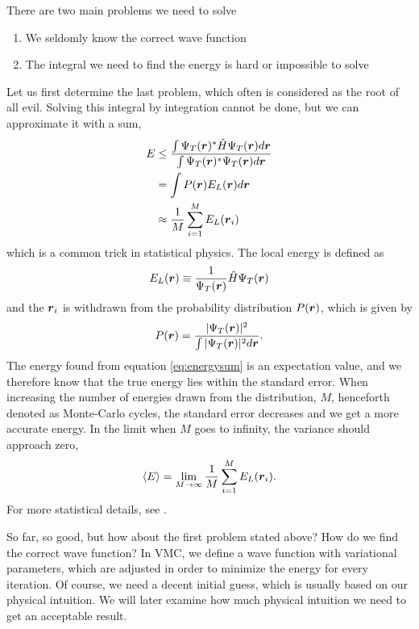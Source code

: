 There are two main problems we need to solve
\begin{enumerate}
	\item We seldomly know the correct wave function
	\item The integral we need to find the energy is hard or impossible to solve
\end{enumerate}
Let us first determine the last problem, which often is considered as the root of all evil. Solving this integral by integration cannot be done, but we can approximate it with a sum,
\begin{align}
E &\leq \frac{\int\Psi_T(\boldsymbol{{r}})^*\hat{H}\Psi_T(\boldsymbol{{r}}) d\boldsymbol{{r}}}{\int\Psi_T(\boldsymbol{{r}})^*\Psi_T(\boldsymbol{{r}}) d\boldsymbol{{r}}} \notag\\
& = \int P(\boldsymbol{{r}}) E_L(\boldsymbol{{r}}) d\boldsymbol{{r}} \notag\\
& \approx \frac{1}{M}\sum_{i=1}^ME_L(\boldsymbol{{r}}_i) \label{eq:energysum}
\end{align}
which is a common trick in statistical physics. The local energy is defined as
\begin{equation}
E_L(\boldsymbol{{r}})\equiv\frac{1}{\Psi_T(\boldsymbol{{r}})}\hat{H}\Psi_T(\boldsymbol{{r}})
\label{eq:local energy}
\end{equation}
and the $\boldsymbol{{r}}_i$ is withdrawn from the probability distribution $P(\boldsymbol{{r}})$, which is given by
\begin{equation}
P(\boldsymbol{{r}})=\frac{|\Psi_T(\boldsymbol{{r}})|^2}{\int|\Psi_T(\boldsymbol{{r}})|^2d\boldsymbol{{r}}}.
\end{equation}
The energy found from equation \eqref{eq:energysum} is an expectation value, and we therefore know that the true energy lies within the standard error. When increasing the number of energies drawn from the distribution, $M$, henceforth denoted as Monte-Carlo cycles, the standard error decreases and we get a more accurate energy. In the limit when $M$ goes to infinity, the variance should approach zero,
\begin{equation}
\langle E\rangle=\lim_{M\to\infty} \frac{1}{M}\sum_{i=1}^ME_L(\boldsymbol{{r}}_i).
\end{equation}
For more statistical details, see \cite{deb_variational_2014}. 

So far, so good, but how about the first problem stated above? How do we find the correct wave function? In VMC, we define a wave function with variational parameters, which are adjusted in order to minimize the energy for every iteration. Of course, we need a decent initial guess, which is usually based on our physical intuition. We will later examine how much physical intuition we need to get an acceptable result. 

